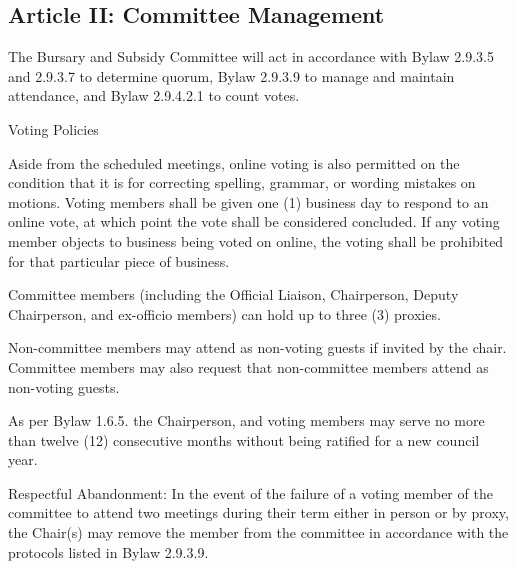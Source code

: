 \subsection{Article II: Committee Management}
\begin{longenum}[ label*=\thesubsection.\arabic*., align=left] 
	\item The Bursary and Subsidy Committee will act in accordance with Bylaw 2.9.3.5 and 2.9.3.7 to determine quorum, Bylaw 2.9.3.9 to manage and maintain attendance, and Bylaw 2.9.4.2.1 to count votes.
	\item Voting Policies
		\begin{longenum}[ label*=\arabic*., align=left] 
		\item Aside from the scheduled meetings, online voting is also permitted on the condition that it is for correcting spelling, grammar, or wording mistakes on motions. Voting members shall be given one (1) business day to respond to an online vote, at which point the vote shall be considered concluded. If any voting member objects to business being voted on online, the voting shall be prohibited for that particular piece of business.
		\item Committee members (including the Official Liaison, Chairperson, Deputy Chairperson, and ex-officio members) can hold up to three (3) proxies.
		\end{longenum}
	\item Non-committee members may attend as non-voting guests if invited by the chair. Committee members may also request that non-committee members attend as non-voting guests.
	\item As per Bylaw 1.6.5. the Chairperson, and voting members may serve no more than twelve (12) consecutive months without being ratified for a new council year.
	\item Respectful Abandonment: In the event of the failure of a voting member of the committee to attend two meetings during their term either in person or by proxy, the Chair(s) may remove the member from the committee in accordance with the protocols listed in Bylaw 2.9.3.9.
\end{longenum}

